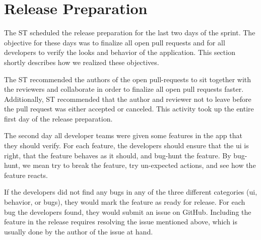 \section{Release Preparation}

The \gls{ST} scheduled the release preparation for the last two days of the sprint. The objective for these days was to finalize all open pull requests and for all developers to verify the looks and behavior of the application. This section shortly describes how we realized these objectives.

The \gls{ST} recommended the authors of the open pull-requests to sit together with the reviewers and collaborate in order to finalize all open pull requests faster. Additionally, \gls{ST} recommended that the author and reviewer not to leave before the pull request was either accepted or canceled. This activity took up the entire first day of the release preparation.

The second day all developer teams were given some features in the app that they should verify. For each feature, the developers should ensure that the \gls{ui} is right, that the feature behaves as it should, and bug-hunt the feature. By bug-hunt, we mean try to break the feature, try un-expected actions, and see how the feature reacts.

If the developers did not find any bugs in any of the three different categories (\gls{ui}, behavior, or bugs), they would mark the feature as ready for release. For each bug the developers found, they would submit an issue on GitHub. Including the feature in the release requires resolving the issue mentioned above, which is usually done by the author of the issue at hand.